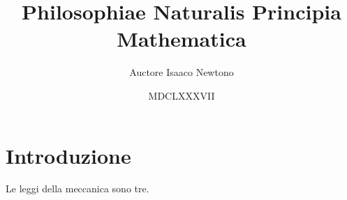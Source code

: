 \documentclass{article}
\title{Philosophiae Naturalis Principia Mathematica}
\author{Auctore Isaaco Newtono}
\date{MDCLXXXVII}
\begin{document}
\maketitle

\section{Introduzione}
Le leggi della meccanica sono tre.
\end{document}
